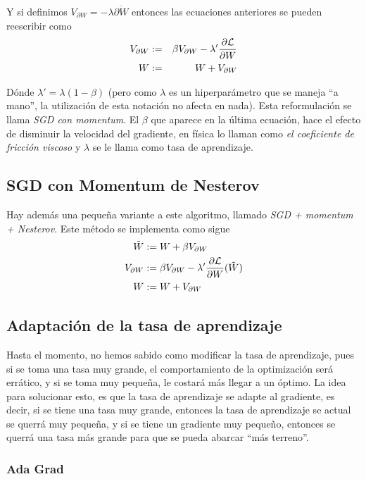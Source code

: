 Y si definimos $V_{\partial W} = -\lambda \overline{\partial W}$ entonces las ecuaciones anteriores se pueden reescribir como
\begin{eqnarray}
V_{\partial W}
&:=& \beta V_{\partial W} - \lambda' \frac{\partial \mathcal{L}}{\partial W} \\
W &:=& W + V_{\partial W}
\end{eqnarray}

Dónde $\lambda' = \lambda(1-\beta)$ (pero como $\lambda$ es un hiperparámetro que se maneja ``a mano'', la utilización de esta notación no afecta en nada). Esta reformulación se llama \textit{SGD con momentum}. El $\beta$ que aparece en la última ecuación, hace el efecto de disminuir la velocidad del gradiente, en física lo llaman como \textit{el coeficiente de fricción viscoso} y $\lambda$ se le llama como tasa de aprendizaje.

\subsection{SGD con Momentum de Nesterov}

Hay además una pequeña variante a este algoritmo, llamado \textit{SGD + momentum + Nesterov}. Este método se implementa como sigue
\begin{align*}
    \Tilde{W} &:= W + \beta V_{\partial W} \\
    V_{\partial W} &:= \beta V_{\partial W} - \lambda' \frac{\partial \mathcal{L}}{\partial W} (\Tilde{W}) \\
    W &:= W + V_{\partial W}
\end{align*}

\subsection{Adaptación de la tasa de aprendizaje}

Hasta el momento, no hemos sabido como modificar la tasa de aprendizaje, pues si se toma una tasa muy grande, el comportamiento de la optimización será errático, y si se toma muy pequeña, le costará más llegar a un óptimo. La idea para solucionar esto, es que la tasa de aprendizaje se adapte al gradiente, es decir, si se tiene una tasa muy grande, entonces la tasa de aprendizaje se actual se querrá muy pequeña, y si se tiene un gradiente muy pequeño, entonces se querrá una tasa más grande para que se pueda abarcar ``más terreno''.

\subsubsection{Ada Grad}

